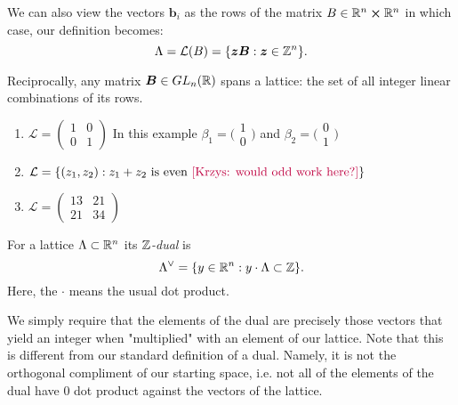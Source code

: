 \begin{remark}
    We can also view the vectors $\bm{b}_i$ as the rows of the matrix $B \in \mathbb{R}^n \cross \mathbb{R}^n$ in which case, our definition becomes:
    $$\Lambda = \mathcal{L}(B) = \{\boldsymbol{zB} :  \boldsymbol{z} \in \mathbb{Z}^n \}.$$
\end{remark}

Reciprocally, any matrix $\boldsymbol{B} \in GL_n(\mathbb{R})$ spans a lattice: the set of all integer linear combinations of its rows.

\begin{example}
\begin{enumerate}
    \item $\mathcal{L} = \begin{pmatrix}
        1 & 0\\
        0 & 1
        \end{pmatrix}$ In this example $\beta_1 = \big(\begin{smallmatrix}
          1\\
          0
        \end{smallmatrix}\big)$ and $\beta_2 = \big(\begin{smallmatrix}
          0\\
          1
        \end{smallmatrix}\big)$
    \item $\mathcal{L} = \{(z_1,z_2) : z_1 + z_2 \text{ is even \textcolor{purple}{[Krzys: would odd work here?]}}\}$
    \item $\mathcal{L} = \begin{pmatrix}
        13 & 21\\
        21 & 34
        \end{pmatrix}$
\end{enumerate}
\end{example}

\begin{definition}[Dual]
    For a lattice $\Lambda \subset \mathbb{R}^n$ its $\mathbb{Z}$\textit{-dual} is
    $$ \Lambda^{\vee} = \{ y \in \mathbb{R}^n : y \cdot \Lambda \subset \mathbb{Z} \}.$$
    Here, the $\cdot$ means the usual dot product.
\end{definition}

We simply require that the elements of the dual are precisely those vectors that yield an integer when "multiplied" with an element of our lattice. Note that this is different from our standard definition of a dual. Namely, it is not the orthogonal compliment of our starting space, i.e. not all of the elements of the dual have 0 dot product against the vectors of the lattice.

